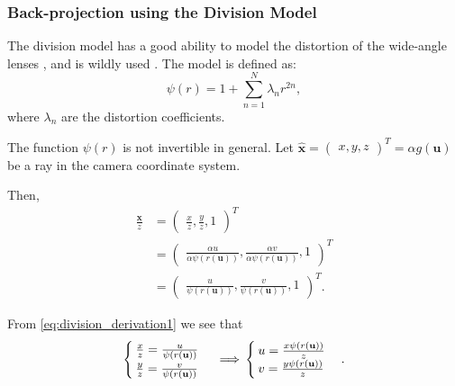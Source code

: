 \subsubsection{Back-projection using the Division Model}\label{subsub:back_projection_using_the_division_model}

The division model has a good ability to model the distortion of the wide-angle
lenses \citep{fitzgibbonSimultaneousLinearEstimation2001}, and is wildly used \citep{prittsMinimalSolversRectifying2021,
	scaramuzzaFlexibleTechniqueAccurate2006}. The model is defined as:
\begin{equation}
	\psi(r) = 1 + \sum_{n = 1}^{N} \lambda_n r^{2n},
\end{equation}
where \(\lambda_n\) are the distortion coefficients.

The function \(\psi(r)\) is not invertible in general.
Let \(\mathbf{\widehat{x}} = \begin{pmatrix}
	x, y, z
\end{pmatrix}^{T} = \alpha g(\mathbf{u})\) be a ray in the camera coordinate system.

Then,
\begin{align}
	\frac{\mathbf{x}}{z} & =
	\begin{pmatrix}
		\frac{x}{z}, \frac{y}{z}, 1
	\end{pmatrix}^{T}                               \\                                  & =
	\begin{pmatrix}
		\frac{\alpha u}{\alpha \psi(r(\mathbf{u}))},
		\frac{\alpha v}{\alpha \psi(r(\mathbf{u}))},
		1
	\end{pmatrix}^{T}  \\
	                     & = \label{eq:division_derivation1}
	\begin{pmatrix}
		\frac{u}{\psi(r(\mathbf{u}))},
		\frac{v}{\psi(r(\mathbf{u}))},
		1
	\end{pmatrix}^{T}.
\end{align}

From \ref{eq:division_derivation1} we see that
\begin{equation} \label{eq:division_derivation2}
	\begin{cases}
		\frac{x}{z} = \frac{u}{\psi(r(\mathbf{u}))} \\
		\frac{y}{z} = \frac{v}{\psi(r(\mathbf{u}))}
	\end{cases} \implies \\
	\begin{cases}
		u = \frac{x \psi(r(\mathbf{u}))}{z} \\
		v = \frac{y \psi(r(\mathbf{u}))}{z}
	\end{cases}.
\end{equation}


